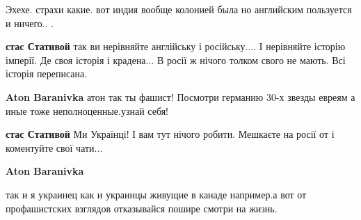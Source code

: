 \begin{itemize}
\begin{itemize}
 
Эхехе. страхи какие. вот индия вообще колонией была но английским пользуется и ничего.. .

\begin{itemize}
 
\textbf{стас Стативой} так ви нерівняйте англійську і російську.... І
нерівняйте історію імперії. Де своя історія і крадена... В росії ж нічого
толком свого не мають. Всі історія переписана.
\end{itemize}

 
\textbf{Aton Baranivka} атон так ты фашист! Посмотри германию 30-х звезды
евреям а иные тоже неполноценные.узнай себя!

\begin{itemize}
 
\textbf{стас Стативой} Ми Українці! І вам тут нічого робити. Мешкаєте на росії от і коментуйте свої чати...

 
\textbf{Aton Baranivka} 

так и я украинец как и украинцы живущие в канаде например.а вот от
профашистских взглядов отказывайся пошире смотри на жизнь.


 

\end{itemize}
\end{itemize}
\end{itemize}
